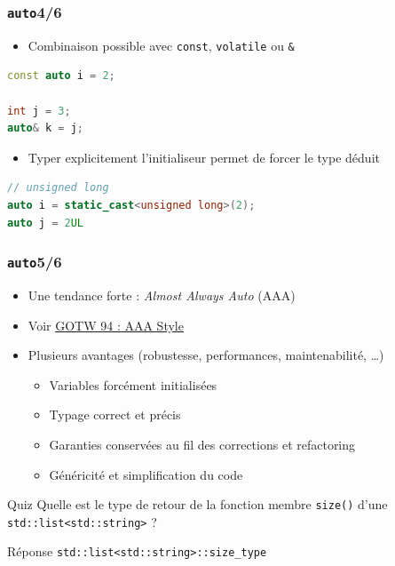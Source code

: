 \documentclass[C++.tex]{subfiles}
\begin{document}
\begin{frame}[fragile]
	\frametitle{\lstinline|auto|\titlehfill{}4/6}
	\begin{itemize}
		\item Combinaison possible avec \lstinline|const|, \lstinline|volatile| ou \lstinline|&|
	\end{itemize}

	\begin{lstlisting}[language=C++]
const auto i = 2;

int j = 3;
auto& k = j;\end{lstlisting}

	\begin{itemize}
		\item Typer explicitement l'initialiseur permet de forcer le type déduit
	\end{itemize}

	\begin{lstlisting}[language=C++]
// unsigned long
auto i = static_cast<unsigned long>(2);
auto j = 2UL\end{lstlisting}
\end{frame}

\begin{frame}[fragile]
	\frametitle{\lstinline|auto|\titlehfill{}5/6}
	\begin{itemize}
		\item Une tendance forte : \textit{Almost Always Auto} (AAA)
		\item Voir \href{https://herbsutter.com/2013/08/12/gotw-94-solution-aaa-style-almost-always-auto/}{GOTW 94 : AAA Style}
		\item Plusieurs avantages (robustesse, performances, maintenabilité, \ldots)
		\begin{itemize}
			\item Variables forcément initialisées
			\item Typage correct et précis
			\item Garanties conservées au fil des corrections et refactoring
			\item Généricité et simplification du code

		\end{itemize}
	\end{itemize}

	\begin{block}{Quiz}
		Quelle est le type de retour de la fonction membre \lstinline|size()| d'une \lstinline|std::list<std::string>| ?
	\end{block}

	\begin{block}{Réponse}
		\lstinline|std::list<std::string>::size_type|
	\end{block}
\end{frame}
\end{document}
